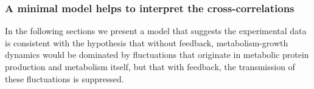 \subsubsection{A minimal model helps to interpret the cross-correlations}

In the following sections we present a model that suggests the experimental data is consistent with the hypothesis 
that without feedback, metabolism-growth dynamics would be dominated by fluctuations that originate in metabolic protein production and metabolism itself,
but that with feedback, the transmission of these fluctuations is suppressed.


